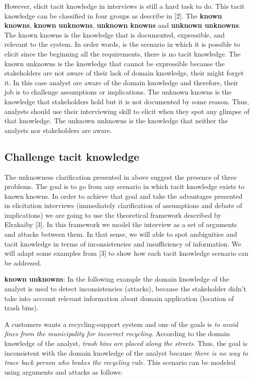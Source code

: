 \documentclass[]{llncs}
\begin{document}
However, elicit tacit knowledge in interviews is still a hard task to
do. This tacit knowledge can be classified in four groups as describe in
{[}2{]}. The \textbf{known knowns}, \textbf{known unknowns},
\textbf{unknown knowns} and \textbf{unknown unknowns}. The known knowns
is the knowledge that is documented, expressible, and relevant to the
system. In order words, is the scenario in which it is possible to
elicit since the beginning all the requirements, there is no tacit
knowledge. The known unknowns is the knowledge that cannot be
expressible because the stakeholders are not aware of their lack of
domain knowledge, their might forget it. In this case analyst are aware
of the domain knowledge and therefore, their job is to challenge
assumptions or implications. The unknown knowns is the knowledge that
stakeholders hold but it is not documented by some reason. Thus,
analysts should use their interviewing skill to elicit when they spot
any glimpse of that knowledge. The unknown unknowns is the knowledge
that neither the analysts nor stakeholders are aware.

\hypertarget{challenge-tacit-knowledge}{%
\subsection{Challenge tacit knowledge}\label{challenge-tacit-knowledge}}

The unknowness clarification presented in above suggest the presence of
three problems. The goal is to go from any scenario in which tacit
knowledge exists to known knowns. In order to achieve that goal and take
the advantages presented in elicitation interviews (immediately
clarification of assumptions and debate of implications) we are going to
use the theoretical framework described by Elrakaiby {[}3{]}. In this
framework we model the interview as a set of arguments and attacks
between them. In that sense, we will able to spot ambiguities and tacit
knowledge in terms of inconsistencies and insufficiency of information.
We will adapt some examples from {[}3{]} to show how each tacit
knowledge scenario can be addresed.

\textbf{known unknowns}: In the following example the domain knowledge
of the analyst is used to detect inconsistencies (attacks), because the
stakeholder didn't take into account relevant information about domain
application (location of trash bins).

A customers wants a recycling-support system and one of the goals is
\emph{to avoid fines from the municipality for incorrect recycling}.
According to the domain knowledge of the analyst, \emph{trash bins are
placed along the streets}. Thus, the goal is inconsistent with the
domain knowledge of the analyst because \emph{there is no way to trace
back person who brakes the recycling rule}. This scenario can be modeled
using arguments and attacks as follows:
\end{document}

